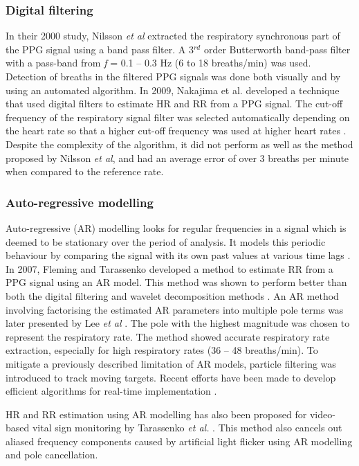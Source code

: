 \subsubsection{Digital filtering}

In their 2000 study, Nilsson \textit{et al} \cite{nilsson2000monitoring} extracted the respiratory synchronous part of the PPG signal using a band pass filter. A 3$^{rd}$ order Butterworth band-pass filter with a pass-band from \textit{f} = 0.1 – 0.3 Hz (6 to 18 breaths/min) was used. Detection of breaths in the filtered PPG signals was done both visually and by using an automated algorithm. In 2009, Nakajima et al. developed a technique that used digital filters to estimate HR and RR from a PPG signal. The cut-off frequency of the respiratory signal filter was selected automatically depending on the heart rate so that a higher cut-off frequency was used at higher heart rates \cite{nakajima1996monitoring}. Despite the complexity of the algorithm, it did not perform as well as the method proposed by Nilsson \textit{et al}, and had an average error of over 3 breaths per minute when compared to the reference rate. 

\subsubsection{Auto-regressive modelling}

Auto-regressive (AR) modelling looks for regular frequencies in a signal which is deemed to be stationary over the period of analysis. It models this periodic behaviour by comparing the signal with its own past values at various time lags \cite{takalo2005tutorial}. In 2007, Fleming and Tarassenko developed a method to estimate RR from a PPG signal using an AR model. This method was shown to perform better than both the digital filtering and wavelet decomposition methods \cite{fleming2007comparison}. An AR method involving factorising the estimated AR parameters into multiple pole terms was later presented by Lee \textit{et al} \cite{lee2010respiratory}. The pole with the highest magnitude was chosen to represent the respiratory rate. The method showed accurate respiratory rate extraction, especially for high respiratory rates (36 – 48 breaths/min). To mitigate a previously described limitation of AR models, particle filtering was introduced to track moving targets. Recent efforts have been made to develop efficient algorithms for real-time implementation \cite{hong2007design}. 

HR and RR estimation using AR modelling has also been proposed for video-based vital sign monitoring by Tarassenko \textit{et al.} \cite{tarassenko2014non}. This method also cancels out aliased frequency components caused by artificial light flicker using AR modelling and pole cancellation.
